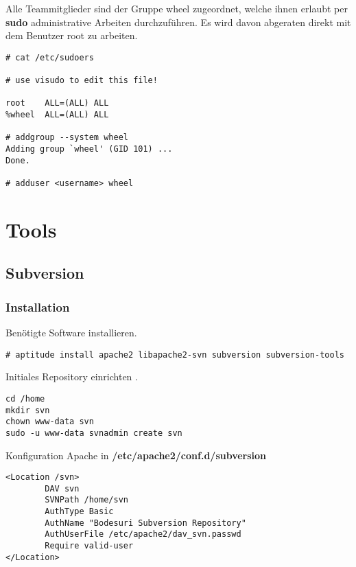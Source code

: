 \documentclass[a4paper,12pt,halfparskip,DIV14]{scrreprt}
\begin{document}
Alle Teammitglieder sind der Gruppe wheel zugeordnet, welche ihnen erlaubt per \textbf{sudo} administrative Arbeiten durchzuführen. Es wird davon abgeraten direkt mit dem Benutzer root zu arbeiten.

\begin{verbatim}
# cat /etc/sudoers 

# use visudo to edit this file!

root    ALL=(ALL) ALL
%wheel  ALL=(ALL) ALL

# addgroup --system wheel
Adding group `wheel' (GID 101) ...
Done.

# adduser <username> wheel
\end{verbatim}




\chapter{Tools} %
\label{cha:tools}

\section{Subversion} %
\label{sec:subversion}

\subsection{Installation} %
\label{sub:installation}

Benötigte Software installieren.

\begin{verbatim}
# aptitude install apache2 libapache2-svn subversion subversion-tools
\end{verbatim}

Initiales Repository einrichten .

\begin{verbatim}
cd /home
mkdir svn
chown www-data svn
sudo -u www-data svnadmin create svn
\end{verbatim}

Konfiguration Apache in \textbf{/etc/apache2/conf.d/subversion}

\begin{verbatim}
<Location /svn>
        DAV svn
        SVNPath /home/svn
        AuthType Basic
        AuthName "Bodesuri Subversion Repository"
        AuthUserFile /etc/apache2/dav_svn.passwd
        Require valid-user
</Location>
\end{verbatim}
\end{document}
